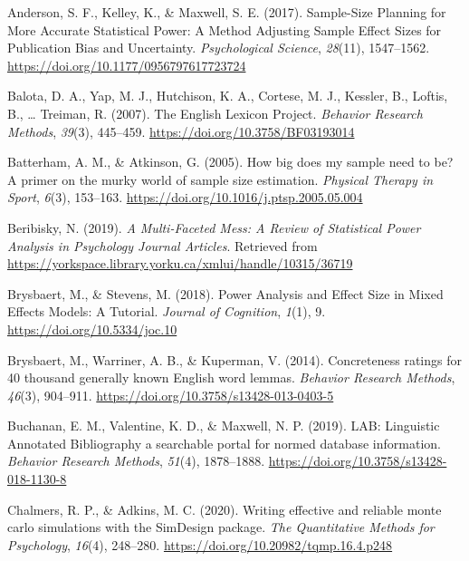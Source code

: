 \documentclass[
  man]{apa6}
\newlength{\cslhangindent}
\newlength{\cslentryspacingunit} %
\newenvironment{CSLReferences}[2] %
 {%
  \setlength{\parindent}{0pt}
  \ifodd #1
  \let\oldpar\par
  \def\par{\hangindent=\cslhangindent\oldpar}
  \fi
  \setlength{\parskip}{#2\cslentryspacingunit}
 }%
 {}
\begin{document}
\hypertarget{refs}{}
\begin{CSLReferences}{1}{0}
\leavevmode{}%
Anderson, S. F., Kelley, K., \& Maxwell, S. E. (2017). Sample-Size Planning for More Accurate Statistical Power: A Method Adjusting Sample Effect Sizes for Publication Bias and Uncertainty. \emph{Psychological Science}, \emph{28}(11), 1547--1562. \url{https://doi.org/10.1177/0956797617723724}

\leavevmode{}%
Balota, D. A., Yap, M. J., Hutchison, K. A., Cortese, M. J., Kessler, B., Loftis, B., \ldots{} Treiman, R. (2007). The English Lexicon Project. \emph{Behavior Research Methods}, \emph{39}(3), 445--459. \url{https://doi.org/10.3758/BF03193014}

\leavevmode{}%
Batterham, A. M., \& Atkinson, G. (2005). How big does my sample need to be? A primer on the murky world of sample size estimation. \emph{Physical Therapy in Sport}, \emph{6}(3), 153--163. \url{https://doi.org/10.1016/j.ptsp.2005.05.004}

\leavevmode{}%
Beribisky, N. (2019). \emph{A Multi-Faceted Mess: A Review of Statistical Power Analysis in Psychology Journal Articles}. Retrieved from \url{https://yorkspace.library.yorku.ca/xmlui/handle/10315/36719}

\leavevmode{}%
Brysbaert, M., \& Stevens, M. (2018). Power Analysis and Effect Size in Mixed Effects Models: A Tutorial. \emph{Journal of Cognition}, \emph{1}(1), 9. \url{https://doi.org/10.5334/joc.10}

\leavevmode{}%
Brysbaert, M., Warriner, A. B., \& Kuperman, V. (2014). Concreteness ratings for 40 thousand generally known English word lemmas. \emph{Behavior Research Methods}, \emph{46}(3), 904--911. \url{https://doi.org/10.3758/s13428-013-0403-5}

\leavevmode{}%
Buchanan, E. M., Valentine, K. D., \& Maxwell, N. P. (2019). LAB: Linguistic Annotated Bibliography {\textendash} a searchable portal for normed database information. \emph{Behavior Research Methods}, \emph{51}(4), 1878--1888. \url{https://doi.org/10.3758/s13428-018-1130-8}

\leavevmode{}%
Chalmers, R. P., \& Adkins, M. C. (2020). Writing effective and reliable monte carlo simulations with the SimDesign package. \emph{The Quantitative Methods for Psychology}, \emph{16}(4), 248--280. \url{https://doi.org/10.20982/tqmp.16.4.p248}


\end{CSLReferences}
\end{document}
